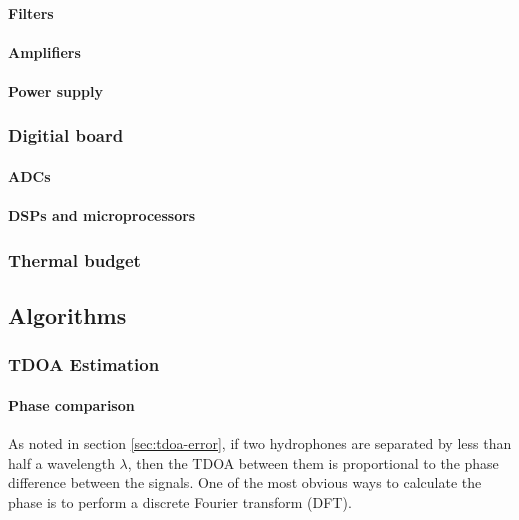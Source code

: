 \documentclass[10pt]{article}
\begin{document}
\paragraph{Filters}

\paragraph{Amplifiers}

\paragraph{Power supply}

\subsubsection{Digitial board}

\paragraph{ADCs}

\paragraph{DSPs and microprocessors}

\subsubsection{Thermal budget}

\subsection{Algorithms}

\subsubsection{TDOA Estimation}

\paragraph{Phase comparison}

As noted in section \ref{sec:tdoa-error}, if two hydrophones are separated by less than half a  wavelength \(\lambda\), then the TDOA between them is proportional to the phase difference between the signals.  One of the most obvious ways to calculate the phase is to perform a discrete Fourier transform (DFT).
\end{document}

